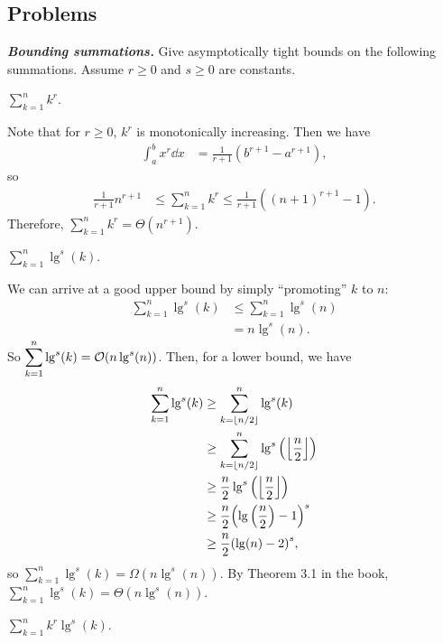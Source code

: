 \documentclass[AppendixA]{subfiles}
\begin{document}
	\subsection*{Problems}

	\begin{problems}
		\item \textbf{\textit{Bounding summations.}} Give asymptotically tight bounds on the following summations. Assume $r \geq 0$ and $s \geq 0$ are constants.
		\begin{problems}
			\item $\displaystyle \sum_{k = 1}^n k^r$.
			\begin{answer}
				Note that for $r \geq 0$, $k^r$ is monotonically increasing. Then we have
				\begin{align*}
					\int_a^b x^r \dd x &= \frac{1}{r + 1}(b^{r + 1} - a^{r + 1}),
				\end{align*}
				so
				\begin{align*}
					\frac{1}{r + 1} n^{r + 1} &\leq \sum_{k = 1}^n k^r \leq \frac{1}{r + 1}((n + 1)^{r + 1} - 1).
				\end{align*}
				Therefore, $\displaystyle \sum_{k = 1}^n k^r = \Theta(n^{r + 1})$.
			\end{answer}

			\item \label{exer:appA-log-sum-bound} $\displaystyle \sum_{k = 1}^n \lg^s(k)$.
			\begin{answer}
				We can arrive at a good upper bound by simply ``promoting'' $k$ to $n$:
				\begin{align*}
					\sum_{k = 1}^n \lg^s(k) &\leq \sum_{k = 1}^n \lg^s(n)\\
						&= n\lg^s(n).
				\end{align*}
				So $\displaystyle \sum_{k = 1}^n \lg^s(k) = \mathcal{O}(n\lg^s(n))$. Then, for a lower bound, we have
				\begin{align*}
					\sum_{k = 1}^n \lg^s(k) &\geq \sum_{k = \lfloor n / 2 \rfloor}^n \lg^s(k)\\
						&\geq \sum_{k = \lfloor n / 2 \rfloor}^n \lg^s \qty(\left\lfloor \frac{n}{2} \right\rfloor)\\
						&\geq \frac{n}{2} \lg^s\qty(\left\lfloor \frac{n}{2} \right\rfloor)\\
						&\geq \frac{n}{2} \qty(\lg \qty(\frac{n}{2}) - 1)^s\\
						&\geq \frac{n}{2} \qty(\lg(n) - 2)^s,
				\end{align*}
				so $\displaystyle \sum_{k = 1}^n \lg^s(k) = \Omega(n\lg^s(n))$. By Theorem 3.1 in the book, $\displaystyle \sum_{k = 1}^n \lg^s(k) = \Theta(n\lg^s(n))$.
			\end{answer}
			
			\item $\displaystyle \sum_{k = 1}^n k^r\lg^s(k)$.
			\begin{answer}
				
			\end{answer}
			
		\end{problems}
	\end{problems}
\end{document}
